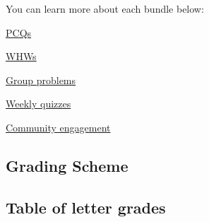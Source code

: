\documentclass[
  letterpaper,
  DIV=11,
  numbers=noendperiod]{scrartcl}
\begin{document}
You can learn more about each bundle below:

\hyperref[pcqs]{PCQs}

\hyperref[whws]{WHWs}

\hyperref[groupwork]{Group problems}

\hyperref[quizzes]{Weekly quizzes}

\hyperref[participation]{Community engagement}

\subsection{Grading Scheme}\label{gradingscheme}

\subsection{Table of letter grades}\label{table-of-letter-grades}
\end{document}
